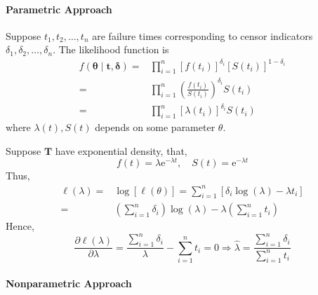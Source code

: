 \paragraph*{Parametric Approach}

Suppose $t_{1},t_{2},\ldots,t_{n}$ are failure times corresponding to censor indicators $\delta_{1},\delta_{2},\ldots,\delta_{n}$. The likelihood function is
\begin{equation}
	\begin{aligned}
		f\left(\boldsymbol{\theta}\mid\mathbf{t},\boldsymbol{\delta}\right)= & \prod_{i=1}^{n}\left[f\left(t_{i}\right)\right]^{\delta_{i}}\left[S\left(t_{i}\right)\right]^{1-\delta_{i}} \\
		=                                                                    & \prod_{i=1}^{n}\left(\frac{f\left(t_{i}\right)}{S\left(t_{i}\right)}\right)^{\delta_{i}}S\left(t_{i}\right) \\
		=                                                                    & \prod_{i=1}^{n}\left[\lambda\left(t_{i}\right)\right]^{\delta_{i}}S\left(t_{i}\right)
	\end{aligned}
\end{equation}
where $\lambda(t),S(t)$ depends on some parameter $\theta$.

\begin{example}
	Suppose $\boldsymbol{T}$ have exponential density, that,
	\begin{equation*}
		f(t)=\lambda \mathrm{e}^{-\lambda t},\quad S(t)=\mathrm{e}^{-\lambda t}
	\end{equation*}
	Thus,
	\begin{equation*}
		\begin{aligned}
			\ell(\lambda)= & \log[\ell(\theta)]=\sum_{i=1}^{n}\left[\delta_{i}\log(\lambda)-\lambda t_{i}\right]        \\
			=              & \left(\sum_{i=1}^{n}\delta_{i}\right)\log(\lambda)-\lambda\left(\sum_{i=1}^{n}t_{i}\right)
		\end{aligned}
	\end{equation*}
	Hence,
	\begin{equation*}
		\frac{\partial\ell(\lambda)}{\partial\lambda}=\frac{\sum_{i=1}^{n}\delta_{i}}{\lambda}-\sum_{i=1}^{n}t_{i}=0\Rightarrow\hat{\lambda}=\frac{\sum_{i=1}^{n}\delta_{i}}{\sum_{i=1}^{n}t_{i}}
	\end{equation*}
\end{example}

\paragraph*{Nonparametric Approach}

